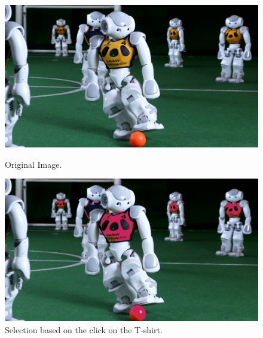 \begin{figure}[h]
	\centering
	\begin{minipage}{0.45\textwidth}
		\centering
		\includegraphics[width=\linewidth]{images/source/2}
		\caption{Original Image.}
		\label{fig:5a}
        \end{minipage}
        \hspace{0.05\textwidth}
        \begin{minipage}{0.45\textwidth}
        		\centering
		\includegraphics[width=\linewidth]{images/source/task5/1}
		\caption{Selection based on the click on the T-shirt.}
		\label{fig:5b}
        \end{minipage}
\end{figure}






